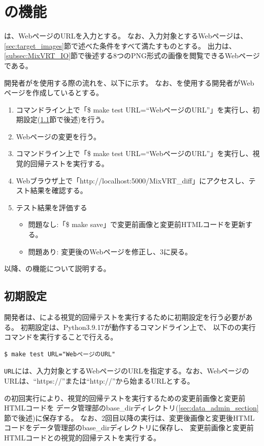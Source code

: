 \section{\toolName の機能}
\toolName は、WebページのURLを入力とする。
なお、入力対象とするWebページは、\ref{sec:target_images}節で述べた条件をすべて満たすものとする。
出力は、\ref{subsec:MixVRT_IO}節で後述する8つのPNG形式の画像を閲覧できるWebページである。
\par
開発者が\toolName を使用する際の流れを、以下に示す。
なお、\toolName を使用する開発者がWebページを作成しているとする。
\begin{enumerate}
    \item コマンドライン上で「\$ make test URL=“WebページのURL”」を実行し、初期設定(\ref{subsec:MixVRT_preparation}節で後述)を行う。
    \item Webページの変更を行う。
    \item コマンドライン上で「\$ make test URL=“WebページのURL”」を実行し、視覚的回帰テストを実行する。
    \item Webブラウザ上で「http://localhost:5000/MixVRT\_diff」にアクセスし、テスト結果を確認する。
    \item テスト結果を評価する
          \begin{itemize}
              \item 問題なし:「\$ make save」で変更前画像と変更前HTMLコードを更新する。
              \item 問題あり: 変更後のWebページを修正し、3に戻る。
          \end{itemize}
\end{enumerate}
以降、\toolName の機能について説明する。

\subsection{初期設定}\label{subsec:MixVRT_preparation}
開発者は、\toolName による視覚的回帰テストを実行するために初期設定を行う必要がある。
初期設定は、Python3.9.17\cite{Python}が動作するコマンドライン上で、
以下の\toolName の実行コマンドを実行することで行える。
\begin{lstlisting}[label=list:command,frame=none,numbers=none,basicstyle={\normalsize \ttfamily \color[gray]{.15}}]
  $ make test URL="WebページのURL"
 \end{lstlisting}
{\tt URL}には、入力対象とするWebページのURLを指定する。なお、WebページのURLは、“https://”または“http://”から始まるURLとする。
\par
\toolName の初回実行により、視覚的回帰テストを実行するための変更前画像と変更前HTMLコードを
データ管理部のbase\_dirディレクトリ(\ref{sec:data_admin_section}節で後述)に保存する。
なお、2回目以降の実行は、変更後画像と変更後HTMLコードをデータ管理部のbase\_dirディレクトリに保存し、
変更前画像と変更前HTMLコードとの視覚的回帰テストを実行する。

